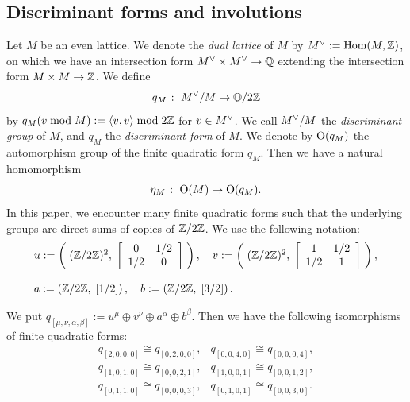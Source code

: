 \documentclass{amsart} %
\begin{document}
\subsection{Discriminant forms and involutions}\label{subsec:discfinvol}
%
\newcommand{\dLat}{M}
\newcommand{\dLatplus}{M_+}
\newcommand{\dLatminus}{M_-}
%
Let $\dLat$ be an even lattice.
We denote the \emph{dual lattice} of $\dLat$ by $\dLat\dual:=\Hom(\dLat, \ZZ)$,
on which we have 
an intersection form $\dLat\dual \times \dLat\dual \to \QQ$
extending the intersection form $\dLat \times \dLat \to \ZZ$.
We define 
\[
q_\dLat\;\colon\; \dLat\dual/\dLat \to \QQ/2\ZZ
\]
by $q_\dLat(v \bmod \dLat):=\intf{v, v} \bmod 2\ZZ$ for $v\in \dLat\dual$.
We call $\dLat\dual/\dLat$ the \emph{discriminant group} of $\dLat$,
and $q_\dLat$ the \emph{discriminant form} of $\dLat$.
We denote by $\OG(q_\dLat)$ the automorphism group of 
the finite quadratic form $q_\dLat$.
Then we have a natural homomorphism
\[
\eta_\dLat\;\colon\; \OG(\dLat) \to \OG(q_\dLat).
\]
%
In this paper,
we encounter many finite quadratic forms 
such that the underlying groups  are 
direct sums of copies of $\mathord{\mathbb{Z}}/2\mathord{\mathbb{Z}}$. 
 We use the following notation:
%
\begin{equation}\label{eq:uvab}
\begin{array}{l}
u:=\left(\;(\mathord{\mathbb{Z}}/2\mathord{\mathbb{Z}})^2, \;\left[\begin{array}{cc}0&1/2 \\1/2 &0\end{array}\right]\;\right),\quad 
v:=\left(\;(\mathord{\mathbb{Z}}/2\mathord{\mathbb{Z}})^2, \;\left[\begin{array}{cc}1&1/2 \\1/2 &1\end{array}\right]\;\right),\\
\\
a:=\left(\mathord{\mathbb{Z}}/2\mathord{\mathbb{Z}}, \;\left[1/2\right]\right),\quad
b:=\left(\mathord{\mathbb{Z}}/2\mathord{\mathbb{Z}}, \;\left[3/2\right]\right).
\end{array}
\end{equation}
%
%
%
\begin{remark}\label{rem:isomqs}
We put  $q_{[\mu,\nu, \alpha, \beta]}:=u^{\mu}\oplus v^{\nu} \oplus a^{\alpha}\oplus b^{\beta}$. 
Then we have the following isomorphisms of finite quadratic forms:
\[
\renewcommand{\arraystretch}{1.1}
\begin{array}{ll}
q_{[ 2, 0, 0, 0]}\cong  q_{[ 0, 2, 0, 0]}, &
q_{[ 0, 0, 4, 0]}\cong  q_{[ 0, 0, 0, 4]}, \\
q_{[ 1, 0, 1, 0]}\cong  q_{[ 0, 0, 2, 1 ]}, &
q_{[  1, 0, 0, 1]}\cong  q_{[ 0, 0, 1, 2 ]},\\
q_{[ 0, 1, 1, 0 ]}\cong  q_{[ 0, 0, 0, 3 ]}, &
q_{[ 0, 1, 0, 1 ]}\cong  q_{[ 0, 0, 3, 0]}.
\end{array}
\]
\end{remark}
\end{document}
